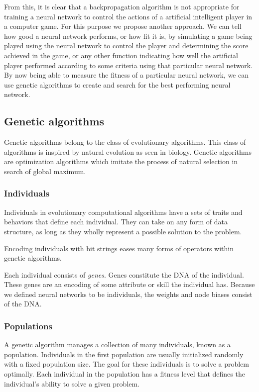 From this, it is clear that a backpropagation algorithm is not appropriate for training a neural network to control the actions of a artificial intelligent player in a computer game. For this purpose we propose another approach. We can tell how good a neural network performs, or how fit it is, by simulating a game being played using the neural network to control the player and determining the score achieved in the game, or any other function indicating how well the artificial player performed according to some criteria using that particular neural network. By now being able to measure the fitness of a particular neural network, we can use genetic algorithms to create and search for the best performing neural network.

\subsection{Genetic algorithms}
Genetic algorithms belong to the class of evolutionary algorithms. This class of algorithms is inspired by natural evolution as seen in biology. Genetic algorithms are optimization algorithms which imitate the process of natural selection in search of global maximum.

\subsubsection{Individuals}
Individuals in evolutionary computational algorithms have a sets of traits and behaviors that define each individual. They can take on any form of data structure, as long as they wholly represent a possible solution to the problem. 

Encoding individuals with bit strings eases many forms of operators within genetic algorithms.

Each individual consists of \emph{genes}. Genes constitute the DNA of the individual. These genes are an encoding of some attribute or skill the individual has. Because we defined neural networks to be individuals, the weights and node biases consist of the DNA.

\subsubsection{Populations}
A genetic algorithm manages a collection of many individuals, known as a population. Individuals in the first population are usually initialized randomly with a fixed population size. The goal for these individuals is to solve a problem optimally. Each individual in the population has a fitness level that defines the individual's ability to solve a given problem.


